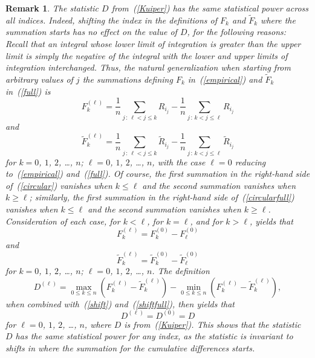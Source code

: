 \documentclass{article}
\newtheorem{remark1}[theorem]{Remark}
\newenvironment{remark}{\begin{remark1} \rm}{\end{remark1}}
\begin{document}
\begin{remark}
\label{zero}
The statistic $D$ from~(\ref{Kuiper}) has the same statistical power
across all indices.
Indeed, shifting the index in the definitions of $F_k$ and $\tilde{F}_k$
where the summation starts has no effect on the value of $D$,
for the following reasons:
Recall that an integral whose lower limit of integration
is greater than the upper limit is simply the negative of the integral
with the lower and upper limits of integration interchanged.
Thus, the natural generalization when starting from arbitrary values of $j$
the summations defining $F_k$ in~(\ref{empirical}) and $\tilde{F}_k$
in~(\ref{full}) is
%
\begin{equation}
\label{circular}
F_k^{(\ell)}
= \frac{1}{n} \sum_{j\,:\,\ell < j \le k} R_{i_j}
- \frac{1}{n} \sum_{j\,:\,k < j \le \ell} R_{i_j}
\end{equation}
%
and
%
\begin{equation}
\label{circularfull}
\tilde{F}_k^{(\ell)}
= \frac{1}{n} \sum_{j\,:\,\ell < j \le k} \tilde{R}_{i_j}
- \frac{1}{n} \sum_{j\,:\,k < j \le \ell} \tilde{R}_{i_j}
\end{equation}
%
for $k = 0$, $1$, $2$, \dots, $n$; $\ell = 0$, $1$, $2$, \dots, $n$,
with the case $\ell = 0$ reducing to~(\ref{empirical}) and~(\ref{full}).
Of course, the first summation in the right-hand side of~(\ref{circular})
vanishes when $k \le \ell$ and the second summation
vanishes when $k \ge \ell$; similarly,
the first summation in the right-hand side of~(\ref{circularfull})
vanishes when $k \le \ell$ and the second summation
vanishes when $k \ge \ell$.
Consideration of each case, for $k < \ell$, for $k = \ell$, and for $k > \ell$,
yields that
%
\begin{equation}
\label{shift}
F_k^{(\ell)} = F_k^{(0)} - F_{\ell}^{(0)}
\end{equation}
%
and
%
\begin{equation}
\label{shiftfull}
\tilde{F}_k^{(\ell)} = \tilde{F}_k^{(0)} - \tilde{F}_{\ell}^{(0)}
\end{equation}
%
for $k = 0$, $1$, $2$, \dots, $n$; $\ell = 0$, $1$, $2$, \dots, $n$.
The definition
%
\begin{equation}
D^{(\ell)}
= \max_{0 \le k \le n} (F_k^{(\ell)}-\tilde{F}_k^{(\ell)})
- \min_{0 \le k \le n} (F_k^{(\ell)}-\tilde{F}_k^{(\ell)}),
\end{equation}
%
when combined with~(\ref{shift}) and~(\ref{shiftfull}),
then yields that
%
\begin{equation}
D^{(\ell)} = D^{(0)} = D
\end{equation}
%
for $\ell = 0$, $1$, $2$, \dots, $n$, where $D$ is from~(\ref{Kuiper}).
This shows that the statistic $D$ has the same statistical power
for any index, as the statistic is invariant to shifts
in where the summation for the cumulative differences starts.
\end{remark}
\end{document}
